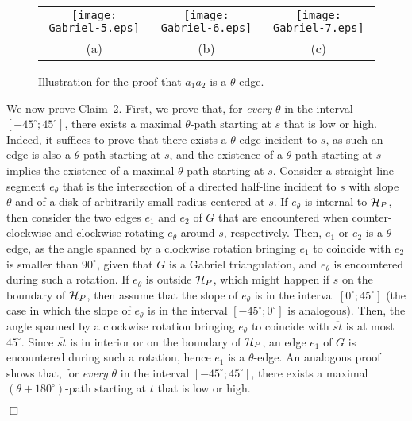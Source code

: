 \documentclass{llncs}
\renewenvironment{proof}
{{\bf Proof:}}{\hspace*{\fill}$\Box$\par\vspace{2mm}}
\begin{document}
\begin{proof}
\begin{figure}[tb]
\begin{center}
\begin{tabular}{c c c}
\mbox{\texttt{[image: Gabriel-5.eps]}} & \hspace{5mm}
\mbox{\texttt{[image: Gabriel-6.eps]}} & \hspace{5mm}
\mbox{\texttt{[image: Gabriel-7.eps]}}\\
(a) \hspace{5mm} & \hspace{5mm} (b) & \hspace{5mm} (c)
\end{tabular}
\caption{Illustration for the proof that $\overline{a_1a_2}$ is a $\theta$-edge.}
\label{fig:gabriel-2}
\end{center}
\end{figure}



We now prove Claim~2.  First, we prove that, for {\em every} $\theta$ in the interval $[-45^\circ;45^\circ]$, there exists a maximal $\theta$-path starting at $s$ that is low or high. Indeed, it suffices to prove that there exists a $\theta$-edge incident to $s$, as such an edge is also a $\theta$-path starting at $s$, and the existence of a $\theta$-path starting at $s$ implies the existence of a maximal $\theta$-path starting at $s$. Consider a straight-line segment $e_{\theta}$ that is the intersection of a directed half-line incident to $s$ with slope $\theta$ and of a disk of arbitrarily small radius centered at $s$. If $e_{\theta}$ is internal to ${\cal H}_P$, then consider the two edges $e_1$ and $e_2$ of $G$ that are encountered when counter-clockwise and clockwise rotating $e_{\theta}$ around $s$, respectively. Then, $e_1$ or $e_2$ is a $\theta$-edge, as the angle spanned by a clockwise rotation bringing $e_1$ to coincide with $e_2$ is smaller than $90^\circ$, given that $G$ is a Gabriel triangulation, and $e_{\theta}$ is encountered during such a rotation. If $e_{\theta}$ is outside ${\cal H}_P$, which might happen if $s$ on the boundary of ${\cal H}_P$, then assume that the slope of $e_{\theta}$ is in the interval $[0^\circ;45^\circ]$ (the case in which the slope of $e_{\theta}$ is in the interval $[-45^\circ;0^\circ]$ is analogous). Then, the angle spanned by a clockwise rotation bringing $e_{\theta}$ to coincide with $\overline{st}$ is  at most $45^\circ$. Since $\overline{st}$ is in interior or on the boundary of ${\cal H}_P$, an edge $e_1$ of $G$ is encountered during such a rotation, hence $e_1$ is a $\theta$-edge. An analogous proof shows that, for {\em every} $\theta$ in the interval $[-45^\circ;45^\circ]$, there exists a maximal $(\theta+180^\circ)$-path starting at $t$ that is low or high.


\end{proof}
\end{document}
